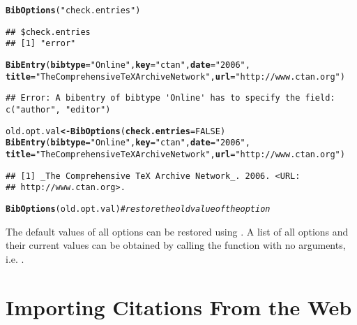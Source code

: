 \documentclass[article]{jss}\usepackage[]{graphicx}\usepackage[]{color}
\makeatletter
\newcommand{\hlnum}[1]{\textcolor[rgb]{0.125,0.125,1}{#1}}%
\newcommand{\hlstr}[1]{\textcolor[rgb]{0.125,0.125,1}{#1}}%
\newcommand{\hlcom}[1]{\textcolor[rgb]{1,0,0.753}{\textit{#1}}}%
\newcommand{\hlstd}[1]{\textcolor[rgb]{0.251,0.251,0.282}{#1}}%
\newcommand{\hlkwb}[1]{\textcolor[rgb]{0.439,0.251,1}{\textbf{#1}}}%
\newcommand{\hlkwc}[1]{\textcolor[rgb]{0.529,0,0.184}{\textbf{#1}}}%
\newcommand{\hlkwd}[1]{\textcolor[rgb]{0.251,0.251,0.282}{\textbf{#1}}}%
\newenvironment{kframe}{%
 \def\at@end@of@kframe{}%
 \ifinner\ifhmode%
  \def\at@end@of@kframe{\end{minipage}}%
  \begin{minipage}{\columnwidth}%
 \fi\fi%
 \def\FrameCommand##1{\hskip\@totalleftmargin \hskip-\fboxsep
 \colorbox{shadecolor}{##1}\hskip-\fboxsep
     \hskip-\linewidth \hskip-\@totalleftmargin \hskip\columnwidth}%
 \MakeFramed {\advance\hsize-\width
   \@totalleftmargin\z@ \linewidth\hsize
   \@setminipage}}%
 {\par\unskip\endMakeFramed%
 \at@end@of@kframe}
\newenvironment{knitrout}{}{} %
\makeatother
\begin{document}
\begin{knitrout}
\color{fgcolor}\begin{kframe}
\begin{alltt}
\hlkwd{BibOptions}\hlstd{(}\hlstr{"check.entries"}\hlstd{)}
\end{alltt}
\begin{verbatim}
## $check.entries
## [1] "error"
\end{verbatim}
\begin{alltt}
\hlkwd{BibEntry}\hlstd{(}\hlkwc{bibtype} \hlstd{=} \hlstr{"Online"}\hlstd{,} \hlkwc{key} \hlstd{=} \hlstr{"ctan"}\hlstd{,} \hlkwc{date} \hlstd{=} \hlstr{"2006"}\hlstd{,}
 \hlkwc{title} \hlstd{=} \hlstr{"The Comprehensive TeX Archive Network"}\hlstd{,} \hlkwc{url} \hlstd{=} \hlstr{"http://www.ctan.org"}\hlstd{)}
\end{alltt}
\begin{lstlisting}[style=error]
## Error: A bibentry of bibtype 'Online' has to specify the field: c("author", "editor")
\end{lstlisting}\begin{alltt}
\hlstd{old.opt.val} \hlkwb{<-} \hlkwd{BibOptions}\hlstd{(}\hlkwc{check.entries} \hlstd{=} \hlnum{FALSE}\hlstd{)}
\hlkwd{BibEntry}\hlstd{(}\hlkwc{bibtype} \hlstd{=} \hlstr{"Online"}\hlstd{,} \hlkwc{key} \hlstd{=} \hlstr{"ctan"}\hlstd{,} \hlkwc{date} \hlstd{=} \hlstr{"2006"}\hlstd{,}
 \hlkwc{title} \hlstd{=} \hlstr{"The Comprehensive TeX Archive Network"}\hlstd{,} \hlkwc{url} \hlstd{=} \hlstr{"http://www.ctan.org"}\hlstd{)}
\end{alltt}
\begin{verbatim}
## [1] _The Comprehensive TeX Archive Network_. 2006. <URL:
## http://www.ctan.org>.
\end{verbatim}
\begin{alltt}
\hlkwd{BibOptions}\hlstd{(old.opt.val)}  \hlcom{# restore the old value of the option}
\end{alltt}
\end{kframe}
\end{knitrout}

The default values of all options can be restored using .  A list of all options and their current values can be obtained by calling the function with no arguments, i.e. .
\section{Importing Citations From the Web}\label{sec_import}
\end{document}
